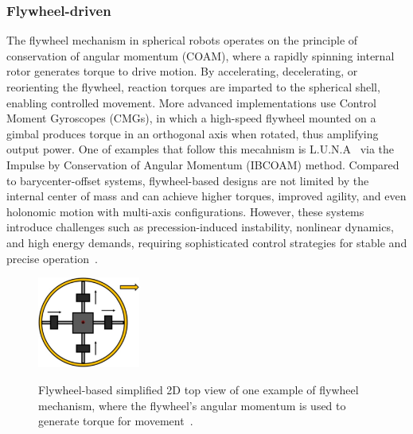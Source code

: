 \documentclass[english, bachelor, utf8]{base/thesis_telematics}
\begin{document}
\subsubsection{Flywheel-driven}
The flywheel mechanism in spherical robots operates on the principle of conservation of angular momentum (COAM), where a rapidly spinning internal rotor generates torque to drive motion. By accelerating, decelerating, or reorienting the flywheel, reaction torques are imparted to the spherical shell, enabling controlled movement.
More advanced implementations use Control Moment Gyroscopes (CMGs), in which a high-speed flywheel mounted on a gimbal produces torque in an orthogonal axis when rotated, thus amplifying output power.
One of examples that follow this mecahnism is L.U.N.A~\cite{luna} via the Impulse by Conservation of Angular Momentum (IBCOAM) method.
Compared to barycenter-offset systems, flywheel-based designs are not limited by the internal center of mass and can achieve higher torques, improved agility, and even holonomic motion with multi-axis configurations.
However, these systems introduce challenges such as precession-induced instability, nonlinear dynamics, and high energy demands, requiring sophisticated control strategies for stable and precise operation~\cite{flywheel_hamaster_explanation}.
\begin{figure}[ht]
    \centering
    \includegraphics[width=0.3\textwidth]{pics/flywheel_2D_top.jpg}
    \label{fig:flywheel_2D_top}
    \caption{Flywheel-based simplified 2D top view of one example of flywheel mechanism, where the flywheel's angular momentum is used to generate torque for movement~\cite{SpheriDrive}.}
\end{figure}
\end{document}
